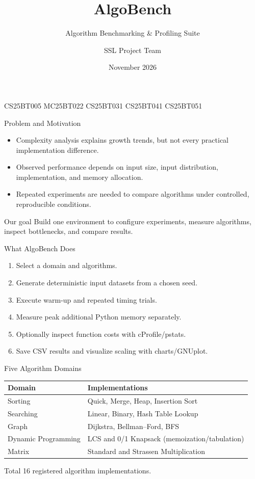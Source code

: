 \documentclass[aspectratio=169]{beamer}
\title[AlgoBench]{AlgoBench}
\subtitle{Algorithm Benchmarking \& Profiling Suite}
\author{SSL Project Team}
\institute{Department of Computer Science and Engineering\\Indian Institute of Technology Dharwad}
\date{November 2026}
\begin{document}
\begin{frame}
  \titlepage
  \vspace{-0.5em}
  \centering
  \small CS25BT005 \quad MC25BT022 \quad CS25BT031 \quad CS25BT041 \quad CS25BT051
\end{frame}

\begin{frame}{Problem and Motivation}
  \begin{itemize}
    \item Complexity analysis explains growth trends, but not every practical implementation difference.
    \item Observed performance depends on input size, input distribution, implementation, and memory allocation.
    \item Repeated experiments are needed to compare algorithms under controlled, reproducible conditions.
  \end{itemize}
  \vspace{0.8em}
  \begin{block}{Our goal}
    Build one environment to configure experiments, measure algorithms, inspect bottlenecks, and compare results.
  \end{block}
\end{frame}

\begin{frame}{What AlgoBench Does}
  \begin{enumerate}
    \item Select a domain and algorithms.
    \item Generate deterministic input datasets from a chosen seed.
    \item Execute warm-up and repeated timing trials.
    \item Measure peak additional Python memory separately.
    \item Optionally inspect function costs with cProfile/pstats.
    \item Save CSV results and visualize scaling with charts/GNUplot.
  \end{enumerate}
\end{frame}

\begin{frame}{Five Algorithm Domains}
  \small
  \begin{tabular}{p{}p{}}
    \toprule
    \textbf{Domain} & \textbf{Implementations}\\
    \midrule
    Sorting & Quick, Merge, Heap, Insertion Sort\\
    Searching & Linear, Binary, Hash Table Lookup\\
    Graph & Dijkstra, Bellman--Ford, BFS\\
    Dynamic Programming & LCS and 0/1 Knapsack (memoization/tabulation)\\
    Matrix & Standard and Strassen Multiplication\\
    \bottomrule
  \end{tabular}
  \vspace{0.8em}
  \begin{block}{Total}
    16 registered algorithm implementations.
  \end{block}
\end{frame}
\end{document}
